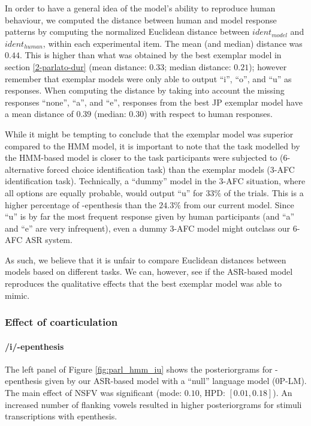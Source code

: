 In order to have a general idea of the model's ability to reproduce human behaviour, we computed the distance between human and model response patterns by computing the normalized Euclidean distance between $ident_{model}$ and $ident_{human}$, within each experimental item. The mean (and median) distance was $0.44$. This is higher than what was obtained by the best exemplar model in section \ref{2-parlato-dur} (mean distance: $0.33$; median distance: $0.21$); however remember that exemplar models were only able to output ``i'', ``o'', and ``u'' as responses. When computing the distance by taking into account the missing responses ``none'', ``a'', and ``e'', responses from the best JP exemplar model have a mean distance of $0.39$ (median: $0.30$) with respect to human responses.

While it might be tempting to conclude that the exemplar model was superior compared to the HMM model, it is important to note that the task modelled by the HMM-based model is closer to the task participants were subjected to (6-alternative forced choice identification task) than the exemplar models (3-AFC identification task). Technically, a ``dummy'' model in the 3-AFC situation, where all options are equally probable, would output ``u'' for $33\%$ of the trials. This is a higher percentage of -epenthesis than the $24.3\%$ from our current model. Since ``u'' is by far the most frequent response given by human participants (and ``a'' and ``e'' are very infrequent), even a dummy 3-AFC  model might outclass our 6-AFC  ASR system.

As such, we believe that it is unfair to compare Euclidean distances between models based on different tasks. We can, however, see if the ASR-based model reproduces the qualitative effects that the best exemplar model was able to mimic.

\subsubsection{Effect of coarticulation}

\paragraph{/i/-epenthesis}

The left panel of Figure \ref{fig:parl_hmm_iu} shows the posteriorgrams for -epenthesis given by our ASR-based model with a ``null'' language model (\textsc{0P-LM}).
The main effect of \textsc{NSFV} was significant (mode: $0.10$, HPD: $[0.01, 0.18]$). An increased number of  flanking vowels resulted in higher posteriorgrams for stimuli transcriptions with  epenthesis.

